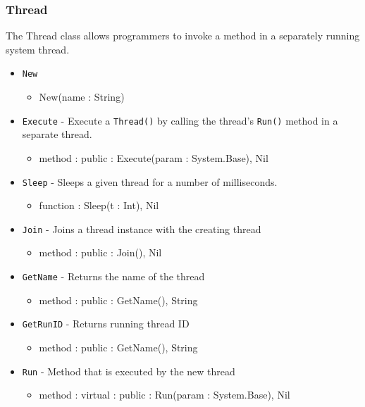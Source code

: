 \documentclass[12pt]{article}
\begin{document}
\subsubsection{Thread}
The Thread class allows programmers to invoke a method in a separately
running system thread.
\begin{itemize}
\item \texttt{New}
  \begin{itemize}
  \item New(name : String)
  \end{itemize} 
\item \texttt{Execute} - Execute a \texttt{Thread()} by calling the thread's \texttt{Run()}
  method in a separate thread.
  \begin{itemize}
  \item method : public : Execute(param : System.Base), Nil
  \end{itemize} 
\item \texttt{Sleep} - Sleeps a given thread for a number of milliseconds.
  \begin{itemize}
  \item function : Sleep(t : Int), Nil
  \end{itemize} 
\item \texttt{Join} - Joins a thread instance with the creating thread
  \begin{itemize}
  \item method : public : Join(), Nil
  \end{itemize}
\item \texttt{GetName} - Returns the name of the thread
  \begin{itemize}
  \item method : public : GetName(), String
  \end{itemize}
\item \texttt{GetRunID} - Returns running thread ID
  \begin{itemize}
  \item method : public : GetName(), String
  \end{itemize} 
\item \texttt{Run} - Method that is executed by the new thread
  \begin{itemize}
  \item method : virtual : public : Run(param : System.Base), Nil
  \end{itemize}
\end{itemize}
\end{document}
